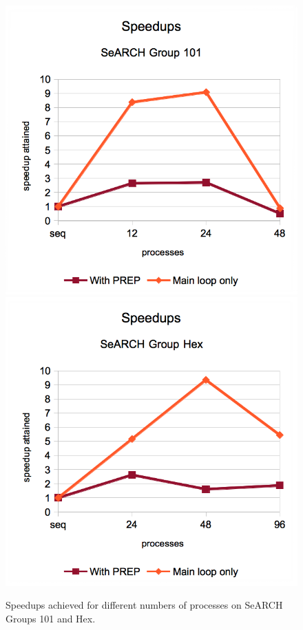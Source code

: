 \begin{figure}
	\begin{center}
		\includegraphics[width=\columnwidth]{report.may/images/speedup101.png}
		\includegraphics[width=\columnwidth]{report.may/images/speeduphex.png}
	\end{center}
	\caption[Speedups]{Speedups achieved for different numbers of processes on SeARCH Groups 101 and Hex.}
	\label{fig:speedup}
\end{figure}

